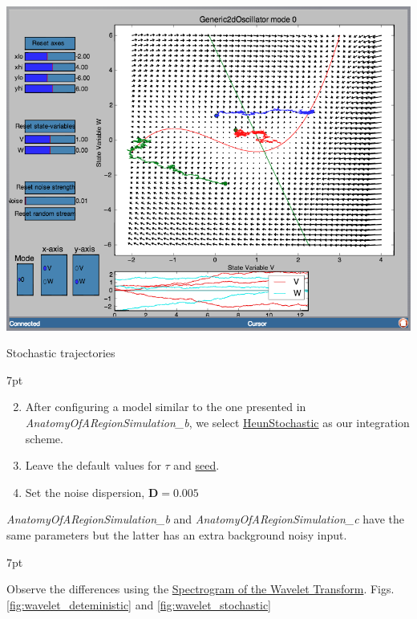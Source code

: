 \documentclass{tufte-handout}
\newenvironment{formal}{%
  \def\FrameCommand{%
    \hspace{1pt}%
    {\color{DarkBlue}\vrule width 2pt}%
    {\color{formalshade}\vrule width 4pt}%
    \colorbox{formalshade}%
  }%
  \MakeFramed{\advance\hsize-\width\FrameRestore}%
  \noindent\hspace{-4.55pt}%
  \begin{adjustwidth}{}{7pt}%
  \vspace{2pt}\vspace{2pt}%
}
{%
  \vspace{2pt}\end{adjustwidth}\endMakeFramed%
}
\newenvironment{simulation}{%
  \def\FrameCommand{%
    \hspace{1pt}%
    {\color{ForestGreen}\vrule width 2pt}%
    {\color{simulationshade}\vrule width 4pt}%
    \colorbox{simulationshade}%
  }%
  \MakeFramed{\advance\hsize-\width\FrameRestore}%
  \noindent\hspace{-4.55pt}%
  \begin{adjustwidth}{}{7pt}%
  \vspace{2pt}\vspace{2pt}%
}
{%
  \vspace{2pt}\end{adjustwidth}\endMakeFramed%
}
\begin{document}
\begin{marginfigure}%
\includegraphics[width=\linewidth]{Handout_UI_BuildingYourOwnBrainNetworkModel_PPI}%
  \caption{Stochastic trajectories}%
  \label{fig:ppi_noise}%
\end{marginfigure}

\begin{simulation}
\begin{enumerate}[resume]
\setcounter{enumi}{1}
\item After configuring a model similar to the one presented in  \textit{AnatomyOfARegionSimulation\_b}, we select \underline{HeunStochastic} as our integration scheme.  
\item Leave the default values for {$\tau$}  and \underline{seed}. 
\item Set the noise dispersion, $\mathbf{D=0.005}$
\end{enumerate}
\end{simulation}

\textit{AnatomyOfARegionSimulation\_b} and \textit{AnatomyOfARegionSimulation\_c} have the same parameters but the latter has an extra background noisy input. 

\begin{formal}
\begin{enumerate}
Observe the differences using the \underline{Spectrogram of the Wavelet Transform}. Figs. \ref{fig:wavelet_deteministic} and \ref{fig:wavelet_stochastic}
\end{enumerate}
\end{formal}
\end{document}
